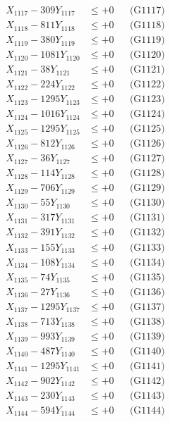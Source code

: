\documentclass[a4paper,10pt]{article}
\begin{document}
{\begin{align}
X_{1117} - 309Y_{1117} &\leq +0 && \text{(G1117)} \\
X_{1118} - 811Y_{1118} &\leq +0 && \text{(G1118)} \\
X_{1119} - 380Y_{1119} &\leq +0 && \text{(G1119)} \\
X_{1120} - 1081Y_{1120} &\leq +0 && \text{(G1120)} \\
\allowbreak
X_{1121} - 38Y_{1121} &\leq +0 && \text{(G1121)} \\
X_{1122} - 224Y_{1122} &\leq +0 && \text{(G1122)} \\
X_{1123} - 1295Y_{1123} &\leq +0 && \text{(G1123)} \\
X_{1124} - 1016Y_{1124} &\leq +0 && \text{(G1124)} \\
X_{1125} - 1295Y_{1125} &\leq +0 && \text{(G1125)} \\
X_{1126} - 812Y_{1126} &\leq +0 && \text{(G1126)} \\
X_{1127} - 36Y_{1127} &\leq +0 && \text{(G1127)} \\
X_{1128} - 114Y_{1128} &\leq +0 && \text{(G1128)} \\
X_{1129} - 706Y_{1129} &\leq +0 && \text{(G1129)} \\
X_{1130} - 55Y_{1130} &\leq +0 && \text{(G1130)} \\
\allowbreak
X_{1131} - 317Y_{1131} &\leq +0 && \text{(G1131)} \\
X_{1132} - 391Y_{1132} &\leq +0 && \text{(G1132)} \\
X_{1133} - 155Y_{1133} &\leq +0 && \text{(G1133)} \\
X_{1134} - 108Y_{1134} &\leq +0 && \text{(G1134)} \\
X_{1135} - 74Y_{1135} &\leq +0 && \text{(G1135)} \\
X_{1136} - 27Y_{1136} &\leq +0 && \text{(G1136)} \\
X_{1137} - 1295Y_{1137} &\leq +0 && \text{(G1137)} \\
X_{1138} - 713Y_{1138} &\leq +0 && \text{(G1138)} \\
X_{1139} - 993Y_{1139} &\leq +0 && \text{(G1139)} \\
X_{1140} - 487Y_{1140} &\leq +0 && \text{(G1140)} \\
\allowbreak
X_{1141} - 1295Y_{1141} &\leq +0 && \text{(G1141)} \\
X_{1142} - 902Y_{1142} &\leq +0 && \text{(G1142)} \\
X_{1143} - 230Y_{1143} &\leq +0 && \text{(G1143)} \\
X_{1144} - 594Y_{1144} &\leq +0 && \text{(G1144)} \\

\end{align}}
\end{document}
